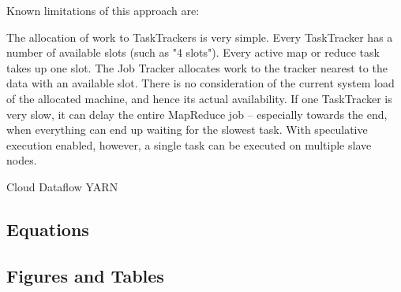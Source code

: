 \documentclass[conference]{IEEEtran}
\begin{document}
Known limitations of this approach are:

The allocation of work to TaskTrackers is very simple. Every TaskTracker has a number of available slots (such as "4 slots"). Every active map or reduce task takes up one slot. The Job Tracker allocates work to the tracker nearest to the data with an available slot. There is no consideration of the current system load of the allocated machine, and hence its actual availability.
If one TaskTracker is very slow, it can delay the entire MapReduce job – especially towards the end, when everything can end up waiting for the slowest task. With speculative execution enabled, however, a single task can be executed on multiple slave nodes.





Cloud Dataflow
YARN


\subsection{Equations}




\subsection{Figures and Tables}



\end{document}
